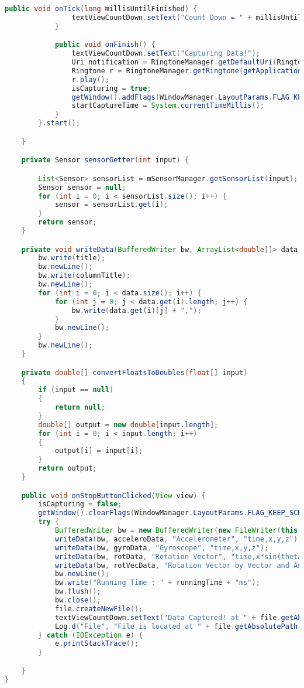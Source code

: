 \begin{lstlisting}[language=Java,basicstyle=\tiny,caption=RecordAllRAWSensorData.java]
            public void onTick(long millisUntilFinished) {
                textViewCountDown.setText("Count Down = " + millisUntilFinished / 1000);
            }

            public void onFinish() {
                textViewCountDown.setText("Capturing Data!");
                Uri notification = RingtoneManager.getDefaultUri(RingtoneManager.TYPE_NOTIFICATION);
                Ringtone r = RingtoneManager.getRingtone(getApplicationContext(), notification);
                r.play();
                isCapturing = true;
                getWindow().addFlags(WindowManager.LayoutParams.FLAG_KEEP_SCREEN_ON);
                startCaptureTime = System.currentTimeMillis();
            }
        }.start();

    }

    private Sensor sensorGetter(int input) {

        List<Sensor> sensorList = mSensorManager.getSensorList(input);
        Sensor sensor = null;
        for (int i = 0; i < sensorList.size(); i++) {
            sensor = sensorList.get(i);
        }
        return sensor;
    }

    private void writeData(BufferedWriter bw, ArrayList<double[]> data, String title, String columnTitle) throws IOException {
        bw.write(title);
        bw.newLine();
        bw.write(columnTitle);
        bw.newLine();
        for (int i = 0; i < data.size(); i++) {
            for (int j = 0; j < data.get(i).length; j++) {
                bw.write(data.get(i)[j] + ",");
            }
            bw.newLine();
        }
        bw.newLine();
    }

    private double[] convertFloatsToDoubles(float[] input)
    {
        if (input == null)
        {
            return null;
        }
        double[] output = new double[input.length];
        for (int i = 0; i < input.length; i++)
        {
            output[i] = input[i];
        }
        return output;
    }

    public void onStopButtonClicked(View view) {
        isCapturing = false;
        getWindow().clearFlags(WindowManager.LayoutParams.FLAG_KEEP_SCREEN_ON);
        try {
            BufferedWriter bw = new BufferedWriter(new FileWriter(this.file));
            writeData(bw, acceleroData, "Accelerometer", "time,x,y,z");
            writeData(bw, gyroData, "Gyroscope", "time,x,y,z");
            writeData(bw, rotData, "Rotation Vector", "time,x*sin(theta/2),y*sin(theta/2),z*sin(theta/2),cos(theta/2),akurasi (dalam radians) (-1 jika tidak ada)");
            writeData(bw, rotVecData, "Rotation Vector by Vector and Angle", "time,x,y,z,theta");
            bw.newLine();
            bw.write("Running Time : " + runningTime + "ms");
            bw.flush();
            bw.close();
            file.createNewFile();
            textViewCountDown.setText("Data Captured! at " + file.getAbsolutePath());
            Log.d("File", "File is located at " + file.getAbsolutePath());
        } catch (IOException e) {
            e.printStackTrace();
        }

    }
}

\end{lstlisting}
